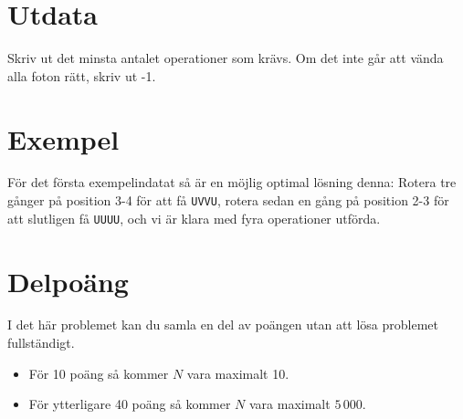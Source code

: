 \section*{Utdata}
Skriv ut det minsta antalet operationer som krävs. Om det inte går att vända
alla foton rätt, skriv ut -1.

\section*{Exempel}
För det första exempelindatat så är en möjlig optimal lösning denna: Rotera
tre gånger på position 3-4 för att få \texttt{UVVU}, rotera sedan en gång på
position 2-3 för att slutligen få \texttt{UUUU}, och vi är klara med fyra
operationer utförda.

\section*{Delpoäng} I det här problemet kan du samla en del av poängen utan att
lösa problemet fullständigt.

\begin{itemize}
    \item För 10 poäng så kommer $N$ vara maximalt 10.
    \item För ytterligare 40 poäng så kommer $N$ vara maximalt $5\,000$.
\end{itemize}
